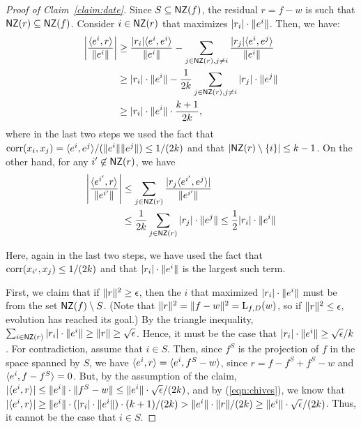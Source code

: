 \begin{proof}[Proof of Claim~\ref{claim:date}] Since $S \subseteq \mathsf{NZ}(f)$, the
residual $r = f - w$ is such that $\mathsf{NZ}(r) \subseteq \mathsf{NZ}(f)$. Consider $i \in \mathsf{NZ}(r)$
that maximizes $|r_i|\cdot \Vert e^i \Vert$. Then, we have:
\begin{align}
\left|\frac{\langle e^i, r \rangle}{\Vert e^i \Vert} \right| &\geq
\frac{|r_i|\langle e^i, e^i \rangle}{\Vert e^i \Vert} - \sum_{j \in \mathsf{NZ}(r), j \neq i}
\frac{|r_j|\langle e^i, e^j \rangle}{\Vert e^i \Vert} \nonumber  \\
&\geq |r_i|\cdot \Vert e^i \Vert - \frac{1}{2k} \sum_{j \in \mathsf{NZ}(r), j \neq i}
|r_j| \cdot \Vert e^j \Vert \label{eqn:chives} \\
&\geq |r_i| \cdot \Vert e^i \Vert \cdot \frac{k+1}{2k}, \nonumber
\end{align}
where in the last two steps we used the fact that $\mathrm{corr}(x_i, x_j) =
\langle e^i, e^j \rangle/(\Vert e^i \Vert \Vert e^j \Vert) \leq 1/(2k)$ and that $|\mathsf{NZ}(r)
\setminus \{ i \}| \leq k-1$. On the other hand, for any $i^\prime \not\in
\mathsf{NZ}(r)$, we have
\begin{align}
\left| \frac{\langle e^{i^\prime}, r \rangle}{\Vert e^{i^\prime} \Vert} \right| &\leq
\sum_{j \in \mathsf{NZ}(r)} \frac{|r_j\langle e^{i^\prime}, e^j \rangle|}{\Vert e^{i^\prime} \Vert}
\nonumber \\
&\leq \frac{1}{2k} \sum_{j \in \mathsf{NZ}(r)} |r_j| \cdot \Vert e^j \Vert \leq \frac{1}{2}
|r_i| \cdot \Vert e^i \Vert \label{eqn:dill}
\end{align}

\noindent Here, again in the last two steps, we have used the fact that
$\mathrm{corr}(x_{i^\prime}, x_j) \leq 1/(2k)$ and that $|r_i| \cdot \Vert e^i \Vert$ is
the largest such term.

First, we claim that if $\Vert r \Vert^2 \geq \epsilon$, then the $i$ that
maximized $|r_i| \cdot \Vert e^i \Vert$ must be from the set $\mathsf{NZ}(f) \setminus
S$. (Note that $\Vert r \Vert^2 = \Vert f - w \Vert^2 = \mathrm{L}_{f, D}(w)$, so if
$\Vert r \Vert^2 \leq \epsilon$, evolution has reached its goal.) By the
triangle inequality, $\sum_{i \in \mathsf{NZ}(r)} |r_i| \cdot \Vert e^i \Vert \geq
\Vert r \Vert \geq \sqrt{\epsilon}$. Hence, it must be the case that $|r_i| \cdot
\Vert e^i \Vert \geq \sqrt{\epsilon}/{k}$. For contradiction, assume that $i \in
S$. Then, since $f^S$ is the projection of $f$ in the space spanned by $S$, we
have $\langle e^i, r \rangle = \langle e^i, f^S - w \rangle$, since $r = f - f^S + f^S - w$ and
$\langle e^i, f - f^S \rangle = 0$. But, by the assumption of the claim, $|\langle e^i, r \rangle|\leq
\Vert e^i \Vert \cdot \Vert f^S - w \Vert \leq \Vert e^i \Vert \cdot
\sqrt{\epsilon}/(2k)$, and by (\ref{eqn:chives}), we know that $|\langle e^i, r \rangle|
\geq \Vert e^i \Vert \cdot (|r_i| \cdot \Vert e^i \Vert) \cdot (k+1)/(2k) >
\Vert e^i \Vert \cdot \Vert r \Vert / (2k) \ge \Vert e^i \Vert \cdot \sqrt{\epsilon}/(2k)$.
Thus, it cannot be the case that $i \in S$.


\end{proof}
